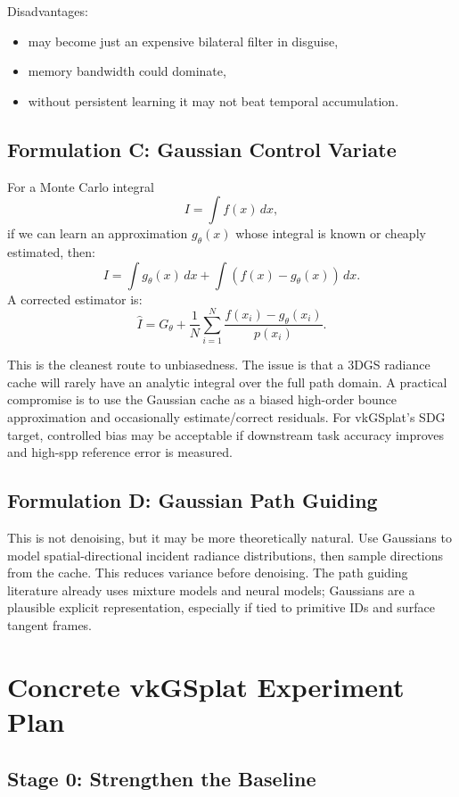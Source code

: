 \documentclass[11pt]{article}
\begin{document}
Disadvantages:

\begin{itemize}
  \item may become just an expensive bilateral filter in disguise,
  \item memory bandwidth could dominate,
  \item without persistent learning it may not beat temporal accumulation.
\end{itemize}

\subsection{Formulation C: Gaussian Control Variate}

For a Monte Carlo integral
\[
  I = \int f(x)\,dx,
\]
if we can learn an approximation $g_\theta(x)$ whose integral is known or
cheaply estimated, then:
\[
  I =
  \int g_\theta(x)\,dx
  + \int (f(x)-g_\theta(x))\,dx.
\]
A corrected estimator is:
\[
  \hat{I} =
  G_\theta
  + \frac{1}{N}\sum_{i=1}^N
    \frac{f(x_i)-g_\theta(x_i)}{p(x_i)}.
\]

This is the cleanest route to unbiasedness. The issue is that a 3DGS radiance
cache will rarely have an analytic integral over the full path domain. A
practical compromise is to use the Gaussian cache as a biased high-order bounce
approximation and occasionally estimate/correct residuals. For vkGSplat's SDG
target, controlled bias may be acceptable if downstream task accuracy improves
and high-spp reference error is measured.

\subsection{Formulation D: Gaussian Path Guiding}

This is not denoising, but it may be more theoretically natural. Use Gaussians
to model spatial-directional incident radiance distributions, then sample
directions from the cache. This reduces variance before denoising. The path
guiding literature already uses mixture models and neural models; Gaussians are
a plausible explicit representation, especially if tied to primitive IDs and
surface tangent frames.

\section{Concrete vkGSplat Experiment Plan}

\subsection{Stage 0: Strengthen the Baseline}
\end{document}
